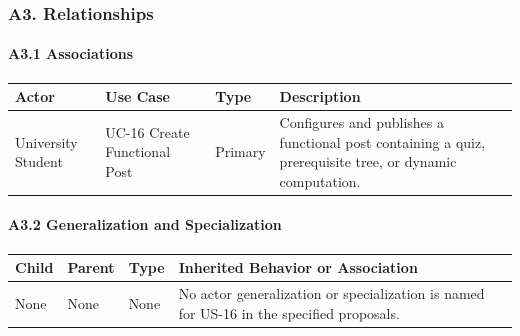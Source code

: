 \documentclass[12pt]{article}
\renewcommand{\baselinestretch}{1.5}
\begin{document}
\hypertarget{sec:a3-relationships}{}
\subsubsection*{A3. Relationships}
\par\medskip

\hypertarget{sec:a3-1-associations}{}
\paragraph*{A3.1 Associations}
\par\medskip

\begingroup
\small
\renewcommand{\baselinestretch}{1.0}\selectfont
\renewcommand{\arraystretch}{1.15}
\setlength{\tabcolsep}{6pt}
\begin{longtable}{|>{\raggedright\arraybackslash}p{}|>{\raggedright\arraybackslash}p{}|>{\raggedright\arraybackslash}p{}|>{\raggedright\arraybackslash}p{}|}
\hline
\textbf{Actor} & \textbf{Use Case} & \textbf{Type} & \textbf{Description} \\ \hline
\endhead
University Student & UC-16 Create Functional Post & Primary & Configures and publishes a functional post containing a quiz, prerequisite tree, or dynamic computation. \\ \hline
\end{longtable}
\endgroup
\par\medskip

\hypertarget{sec:a3-2-generalization-and-specialization}{}
\paragraph*{A3.2 Generalization and Specialization}
\par\medskip

\begingroup
\small
\renewcommand{\baselinestretch}{1.0}\selectfont
\renewcommand{\arraystretch}{1.15}
\setlength{\tabcolsep}{6pt}
\begin{longtable}{|>{\raggedright\arraybackslash}p{}|>{\raggedright\arraybackslash}p{}|>{\raggedright\arraybackslash}p{}|>{\raggedright\arraybackslash}p{}|}
\hline
\textbf{Child} & \textbf{Parent} & \textbf{Type} & \textbf{Inherited Behavior or Association} \\ \hline
\endhead
None & None & None & No actor generalization or specialization is named for US-16 in the specified proposals. \\ \hline
\end{longtable}
\endgroup
\par\medskip
\end{document}
